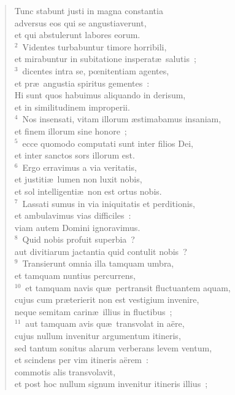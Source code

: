 \begin{flushleft}\begin{verse}\vspace{-19pt}Tunc stabunt justi in magna constantia\\ adversus eos qui se angustiaverunt,\\ et qui abstulerunt labores eorum.\\
${}^{2}$~Videntes turbabuntur timore horribili,\\ et mirabuntur in subitatione insperat\ae\ salutis~;\\
${}^{3}$~dicentes intra se, pœnitentiam agentes,\\ et pr\ae\ angustia spiritus gementes~:\\ Hi sunt quos habuimus aliquando in derisum,\\ et in similitudinem improperii.\\
${}^{4}$~Nos insensati, vitam illorum \ae stimabamus insaniam,\\ et finem illorum sine honore~;\\
${}^{5}$~ecce quomodo computati sunt inter filios Dei,\\ et inter sanctos sors illorum est.\\
${}^{6}$~Ergo erravimus a via veritatis,\\ et justiti\ae\ lumen non luxit nobis,\\ et sol intelligenti\ae\ non est ortus nobis.\\
${}^{7}$~Lassati sumus in via iniquitatis et perditionis,\\ et ambulavimus vias difficiles~:\\ viam autem Domini ignoravimus.\\
${}^{8}$~Quid nobis profuit superbia~?\\ aut divitiarum jactantia quid contulit nobis~?\\
${}^{9}$~Transierunt omnia illa tamquam umbra,\\ et tamquam nuntius percurrens,\\
${}^{10}$~et tamquam navis qu\ae\ pertransit fluctuantem aquam,\\ cujus cum pr\ae terierit non est vestigium invenire,\\ neque semitam carin\ae\ illius in fluctibus~;\\
${}^{11}$~aut tamquam avis qu\ae\ transvolat in a\"ere,\\ cujus nullum invenitur argumentum itineris,\\ sed tantum sonitus alarum verberans levem ventum,\\ et scindens per vim itineris a\"erem~:\\ commotis alis transvolavit,\\ et post hoc nullum signum invenitur itineris illius~;\\

\end{verse}
\end{flushleft}
